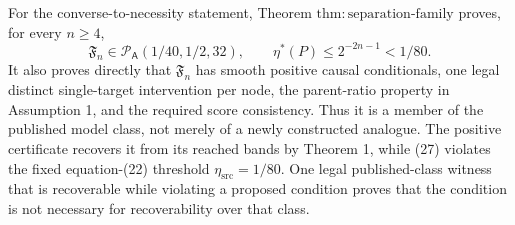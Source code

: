 For the converse-to-necessity statement, Theorem \(\mathrm{thm{:}separation\mbox{-}family}\) proves, for every \(n\ge4\),
\[
 \mathfrak F_n\in\mathcal P_{\mathsf A}(1/40,1/2,32),
 \qquad
 \eta^{\ast}(P)\le2^{-2n-1}<1/80.
 \tag{27}
\]
It also proves directly that \(\mathfrak F_n\) has smooth positive causal conditionals, one legal distinct single-target intervention per node, the parent-ratio property in Assumption 1, and the required score consistency.  Thus it is a member of the published model class, not merely of a newly constructed analogue.  The positive certificate recovers it from its reached bands by Theorem 1, while (27) violates the fixed equation-(22) threshold \(\eta_{\mathrm{src}}=1/80\).  One legal published-class witness that is recoverable while violating a proposed condition proves that the condition is not necessary for recoverability over that class.

